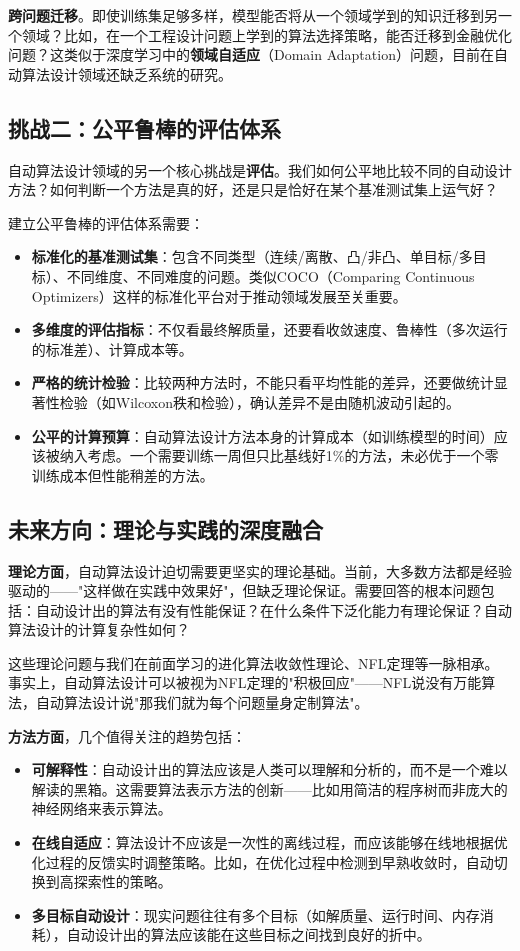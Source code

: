 \documentclass[lang=cn,zihao=-4,a4paper,fontset=windows]{beautybook}
\begin{document}
\textbf{跨问题迁移}。即使训练集足够多样，模型能否将从一个领域学到的知识迁移到另一个领域？比如，在一个工程设计问题上学到的算法选择策略，能否迁移到金融优化问题？这类似于深度学习中的\textbf{领域自适应}（Domain Adaptation）问题，目前在自动算法设计领域还缺乏系统的研究。

\subsection{挑战二：公平鲁棒的评估体系}

自动算法设计领域的另一个核心挑战是\textbf{评估}。我们如何公平地比较不同的自动设计方法？如何判断一个方法是真的好，还是只是恰好在某个基准测试集上运气好？

建立公平鲁棒的评估体系需要：
\begin{itemize}
    \item \textbf{标准化的基准测试集}：包含不同类型（连续/离散、凸/非凸、单目标/多目标）、不同维度、不同难度的问题。类似COCO（Comparing Continuous Optimizers）这样的标准化平台对于推动领域发展至关重要。
    \item \textbf{多维度的评估指标}：不仅看最终解质量，还要看收敛速度、鲁棒性（多次运行的标准差）、计算成本等。
    \item \textbf{严格的统计检验}：比较两种方法时，不能只看平均性能的差异，还要做统计显著性检验（如Wilcoxon秩和检验），确认差异不是由随机波动引起的。
    \item \textbf{公平的计算预算}：自动算法设计方法本身的计算成本（如训练模型的时间）应该被纳入考虑。一个需要训练一周但只比基线好1\%的方法，未必优于一个零训练成本但性能稍差的方法。
\end{itemize}

\subsection{未来方向：理论与实践的深度融合}

\textbf{理论方面}，自动算法设计迫切需要更坚实的理论基础。当前，大多数方法都是经验驱动的——"这样做在实践中效果好"，但缺乏理论保证。需要回答的根本问题包括：自动设计出的算法有没有性能保证？在什么条件下泛化能力有理论保证？自动算法设计的计算复杂性如何？

这些理论问题与我们在前面学习的进化算法收敛性理论、NFL定理等一脉相承。事实上，自动算法设计可以被视为NFL定理的"积极回应"——NFL说没有万能算法，自动算法设计说"那我们就为每个问题量身定制算法"。

\textbf{方法方面}，几个值得关注的趋势包括：
\begin{itemize}
    \item \textbf{可解释性}：自动设计出的算法应该是人类可以理解和分析的，而不是一个难以解读的黑箱。这需要算法表示方法的创新——比如用简洁的程序树而非庞大的神经网络来表示算法。
    \item \textbf{在线自适应}：算法设计不应该是一次性的离线过程，而应该能够在线地根据优化过程的反馈实时调整策略。比如，在优化过程中检测到早熟收敛时，自动切换到高探索性的策略。
    \item \textbf{多目标自动设计}：现实问题往往有多个目标（如解质量、运行时间、内存消耗），自动设计出的算法应该能在这些目标之间找到良好的折中。
\end{itemize}
\end{document}
